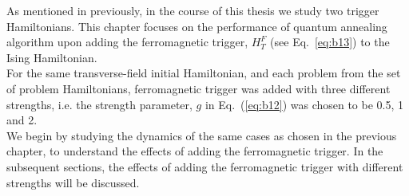 \documentclass[../main.tex]{subfiles}
\begin{document}
As mentioned in previously, in the course of this thesis we study two trigger Hamiltonians. This chapter focuses on the performance of quantum annealing algorithm upon adding the ferromagnetic trigger, $H_T^F$ (see Eq.~\ref{eq:b13}) to the Ising Hamiltonian. \\
For the same transverse-field initial Hamiltonian, and each problem from the set of problem Hamiltonians, ferromagnetic trigger was added with three different strengths, i.e. the strength parameter, $g$ in Eq.~(\ref{eq:b12}) was chosen to be 0.5, 1 and 2.\\
We begin by studying the dynamics of the same cases as chosen in the previous chapter, to understand the effects of adding the ferromagnetic trigger. In the subsequent sections, the effects of adding the ferromagnetic trigger with different strengths will be discussed. 
\end{document}
